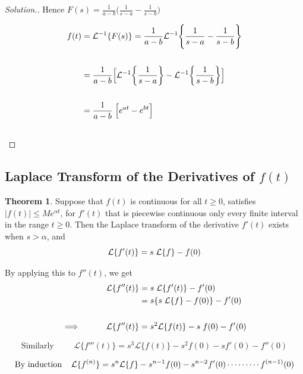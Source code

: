 \documentclass[11pt,a4paper]{article}
\theoremstyle{definition}
\newtheorem{thm}{Theorem}[subsection]
\newenvironment{solution}
  {\renewcommand{\qedsymbol}{}\begin{proof}[\textit{Solution}.]}
  {\end{proof}}
\begin{document}
\begin{solution}
Hence $\displaystyle{F(s) = \frac{1}{a-b}\Bigg( \frac{1}{s - a} - \frac{1}{s-b}\Bigg) }$

\begin{align*}
f(t) & = \mathcal{L}^{-1}\{F(s)\} = \frac{1}{a-b}\mathcal{L}^{-1}\Bigg\{\frac{1}{s - a}- \frac{1}{s - b}\Bigg\}\\\\
& = \frac{1}{a -b}\Big[\mathcal{L}^{-1}\bigg\{\frac{1}{s - a}\bigg\} - \mathcal{L}^{-1}\bigg\{\frac{1}{s-b}\bigg\}\Big]\\\\
& = \frac{1}{a - b}\hspace{0.1cm} \Big[e^{at} - e^{bt}\Big]\\\\
\end{align*}
\end{solution}

{\color[wave]{485}\subsection{Laplace Transform of the Derivatives of $f(t)$}}

\begin{thm}


Suppose that $f(t)$ is continuous for all $t\geq 0$, satisfies $\big|f(t)\big| \leq Me^{\alpha t}$, for $f'(t)$ that is piecewise continuous only every finite interval in the range $t\geq 0$. Then the Laplace transform of the derivative $f'(t)$ exists when $s>\alpha$, and $$\mathcal{L}\{f'(t)\} = s\hspace{0.1cm} \mathcal{L}\{f\} - f(0)$$

By applying this to $f''(t)$, we get 
\begin{align*}
\mathcal{L}\{f''(t)\} & = s\hspace{0.1cm} \mathcal{L}\{f'(t)\} - f'(0)\\
& = s\{s\hspace{0.1cm} \mathcal{L}\{f\} -f(0)\} -f'(0)\\\\
\implies\hspace{1cm} \mathcal{L}\{f''(t)\} & = s^2\mathcal{L}\{f(t)\} - s\hspace{0.1cm} f(0) - f'(0)
\end{align*}

$$\text{Similarly}\hspace{1cm} \mathcal{L}\{f'''(t)\} = s^3\mathcal{L}\{f(t)\} - s^2f(0) - sf'(0) - f''(0)$$

$$\text{By induction}\hspace{0.4cm} \mathcal{L}\{f^{(n)}\} = s^n \mathcal{L}\{f\} - s^{n-1}f(0)- s^{n-2}f'(0) \cdots\cdots\cdots f^{(n-1)}(0)$$
\end{thm}
\end{document}

